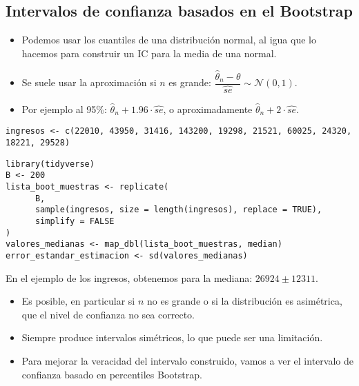 \subsection{Intervalos de confianza basados en el Bootstrap}
\begin{tcolorbox}[colback=blue!5!white, colframe=blue!75!black, title=\textbf{Una primera aproximación}]
\begin{itemize}[label=\textbullet]
    \item Podemos usar los cuantiles de una distribución normal, al igua que lo hacemos para construir un IC para la media de una normal.
    \item Se suele usar la aproximación si $n$ es grande: $\dfrac{\hat{\theta}_n-\theta}{\hat{se}}\sim \mathcal{N}(0,1)$.
    \item Por ejemplo al 95\%: $\hat{\theta}_n+1.96\cdot \hat{se}$, o aproximadamente $\hat{\theta}_n+2\cdot \hat{se}$.
\end{itemize}
\end{tcolorbox}
\begin{lstlisting}
ingresos <- c(22010, 43950, 31416, 143200, 19298, 21521, 60025, 24320, 18221, 29528) 
\end{lstlisting}
\begin{lstlisting}
library(tidyverse)
B <- 200
lista_boot_muestras <- replicate(
      B,
      sample(ingresos, size = length(ingresos), replace = TRUE),
      simplify = FALSE
)
valores_medianas <- map_dbl(lista_boot_muestras, median)
error_estandar_estimacion <- sd(valores_medianas)
\end{lstlisting}
En el ejemplo de los ingresos, obtenemos para la mediana: $26924\pm 12311$.
\begin{tcolorbox}[colback=olive!5!white, colframe=olive!75!black, title=\textbf{La construcción anterior es una aproximación}]
\begin{itemize}[label=\textbullet]
    \item Es posible, en particular si $n$ no es grande o si la distribución es asimétrica, que el nivel de confianza no sea correcto.
    \item Siempre produce intervalos simétricos, lo que puede ser una limitación.
    \item Para mejorar la veracidad del intervalo construido, vamos a ver el intervalo de confianza basado en percentiles Bootstrap.
\end{itemize}
\end{tcolorbox}
